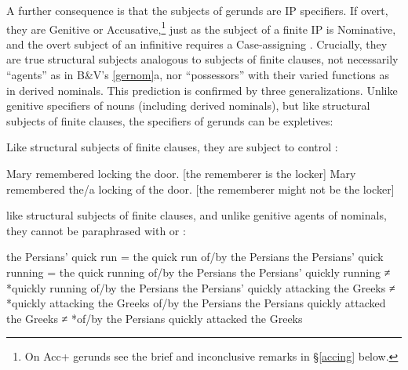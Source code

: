 \documentclass[output=paper,
modfonts
]{LSP/langsci}
\begin{document}
A further consequence is that the subjects of gerunds are IP specifiers.  If overt, they are
Genitive or Accusative,\footnote{On Acc+ gerunds see the brief and inconclusive
  remarks in \S\ref{accing} below.} just as the subject of a finite IP is Nominative, and
the overt subject of an infinitive requires a Case-assigning .  Crucially, they
are true structural subjects analogous to subjects of finite clauses, not necessarily
``agents'' as in B\&V's \cref{gernom}{a}, nor ``possessors'' with their varied functions as in
derived nominals.  This prediction is confirmed by three generalizations.  Unlike genitive
specifiers of nouns (including derived nominals), but like structural subjects of finite
clauses, the specifiers of gerunds can be expletives:
Like structural subjects of finite clauses, they are subject to control \citep[1190]{huddleston2002}:
\begin{exe}
\ex\label{lock}
	\ea Mary remembered locking the door.   [the rememberer is the locker]
	\ex Mary remembered the/a locking of the door.  [the rememberer might not  be the locker]
	\z  
\end{exe}
like structural subjects of finite clauses, and unlike genitive agents of nominals, 
they  cannot be paraphrased with  or :
\begin{exe}
\ex\label{persians}
	\ea the Persians' quick run = the quick run of/by the Persians
	\ex the Persians' quick running = the quick running of/by the Persians
	\ex the Persians' quickly running ≠ *quickly running of/by the Persians
	\ex the Persians' quickly attacking the Greeks ≠ *quickly attacking the Greeks of/by the Persians
	\ex the Persians quickly attacked the Greeks ≠ *of/by the Persians quickly attacked the Greeks 
	\z
\end{exe}
\end{document}
